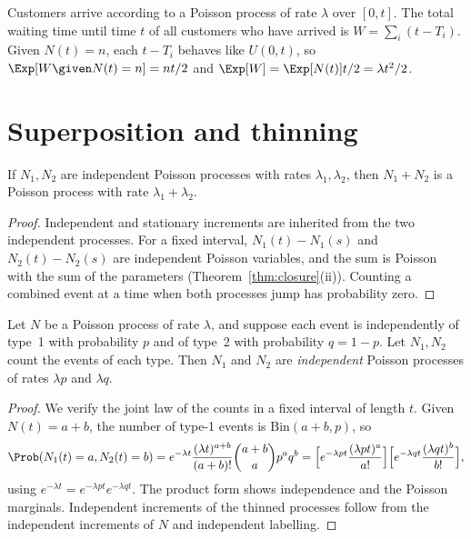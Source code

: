\begin{example}
Customers arrive according to a Poisson process of rate $\lambda$ over $[0,t]$. The total
waiting time until time $t$ of all customers who have arrived is $W=\sum_i(t-T_i)$. Given
$N(t)=n$, each $t-T_i$ behaves like $U(0,t)$, so $\Exp[W\given N(t)=n]=nt/2$ and
$\Exp[W]=\Exp[N(t)]t/2=\lambda t^2/2$.
\end{example}

\section{Superposition and thinning}

\begin{theorem}[Superposition]\label{thm:superposition}
If $N_1,N_2$ are independent Poisson processes with rates $\lambda_1,\lambda_2$, then
$N_1+N_2$ is a Poisson process with rate $\lambda_1+\lambda_2$.
\end{theorem}
\begin{proof}
Independent and stationary increments are inherited from the two independent processes.
For a fixed interval, $N_1(t)-N_1(s)$ and $N_2(t)-N_2(s)$ are independent Poisson
variables, and the sum is Poisson with the sum of the parameters
(Theorem~\ref{thm:closure}(ii)). Counting a combined event at a time when both processes
jump has probability zero.
\end{proof}

\begin{theorem}[Thinning]\label{thm:thinning}
Let $N$ be a Poisson process of rate $\lambda$, and suppose each event is independently
of type~1 with probability $p$ and of type~2 with probability $q=1-p$. Let $N_1,N_2$ count
the events of each type. Then $N_1$ and $N_2$ are \emph{independent} Poisson processes of
rates $\lambda p$ and $\lambda q$.
\end{theorem}
\begin{proof}
We verify the joint law of the counts in a fixed interval of length $t$. Given
$N(t)=a+b$, the number of type-1 events is $\mathrm{Bin}(a+b,p)$, so
\[
\Prob(N_1(t)=a,N_2(t)=b)=e^{-\lambda t}\frac{(\lambda t)^{a+b}}{(a+b)!}\binom{a+b}{a}p^aq^b
=\Bigl[e^{-\lambda pt}\frac{(\lambda pt)^a}{a!}\Bigr]\Bigl[e^{-\lambda qt}\frac{(\lambda qt)^b}{b!}\Bigr],
\]
using $e^{-\lambda t}=e^{-\lambda pt}e^{-\lambda qt}$. The product form shows independence and the
Poisson marginals. Independent increments of the thinned processes follow from the
independent increments of $N$ and independent labelling.
\end{proof}

